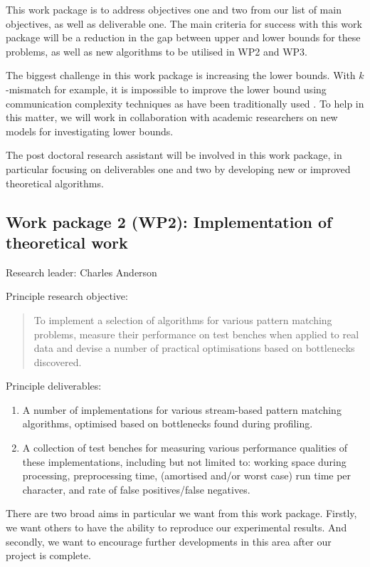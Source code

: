 \documentclass[a4paper,11pt]{article}
\begin{document}
    This work package is to address objectives one and two from our list of main objectives, as well as deliverable one. The main criteria for success with this work package will be a reduction in the gap between upper and lower bounds for these problems, as well as new algorithms to be utilised in WP2 and WP3.

    The biggest challenge in this work package is increasing the lower bounds. With $k$-mismatch for example, it is impossible to improve the lower bound using communication complexity techniques as have been traditionally used \cite{DBLP:journals/corr/abs-1106-4412}. To help in this matter, we will work in collaboration with academic researchers on new models for investigating lower bounds.

    The post doctoral research assistant will be involved in this work package, in particular focusing on deliverables one and two by developing new or improved theoretical algorithms.

    \subsection*{Work package 2 (WP2): Implementation of theoretical work}

    Research leader: Charles Anderson

    Principle research objective:
    \begin{quote}
        To implement a selection of algorithms for various pattern matching problems, measure their performance on test benches when applied to real data and devise a number of practical optimisations based on bottlenecks discovered.
    \end{quote}

    Principle deliverables:
    \begin{enumerate}
        \item A number of implementations for various stream-based pattern matching algorithms, optimised based on bottlenecks found during profiling.
        \item A collection of test benches for measuring various performance qualities of these implementations, including but not limited to: working space during processing, preprocessing time, (amortised and/or worst case) run time per character, and rate of false positives/false negatives.
    \end{enumerate}

    There are two broad aims in particular we want from this work package. Firstly, we want others to have the ability to reproduce our experimental results. And secondly, we want to encourage further developments in this area after our project is complete.
\end{document}
